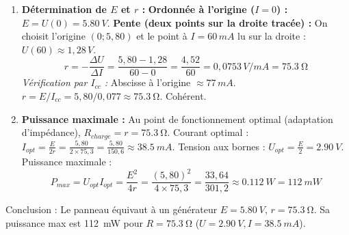 \documentclass[11pt]{article}
\newcommand{\cle}[1]{{\popxbold\color{popdark}#1}}
\begin{document}
\begin{exoresolu}
\begin{enumerate}
\begin{popfigure}
    \end{popfigure}
    Les points expérimentaux sont parfaitement alignés. Le panneau se comporte comme un \textbf{générateur linéaire} (modèle de Thévenin valide).
    \item \textbf{Détermination de $E$ et $r$ :}
    \textbf{Ordonnée à l'origine ($I=0$) :} $E = U(0) = \SI{5,80}{V}$.
    \textbf{Pente (deux points sur la droite tracée) :} On choisit l'origine $(0; 5,80)$ et le point à $I=60\,\si{mA}$ lu sur la droite : $U(60) \approx 1,28\,\si{V}$.
    \[ r = -\frac{\Delta U}{\Delta I} = \frac{5,80 - 1,28}{60 - 0} = \frac{4,52}{60} = 0,0753\,\si{V/mA} = \SI{75,3}{\ohm} \]
    \textit{Vérification par $I_{cc}$ :} Abscisse à l'origine $\approx 77\,\si{mA}$. $r = E/I_{cc} = 5,80 / 0,077 \approx \SI{75,3}{\ohm}$. Cohérent.
    \item \textbf{Puissance maximale :}
    Au point de fonctionnement optimal (adaptation d'impédance), $R_{charge} = r = \SI{75,3}{\ohm}$.
    Courant optimal : $I_{opt} = \frac{E}{2r} = \frac{5,80}{2 \times 75,3} = \frac{5,80}{150,6} \approx \SI{38,5}{mA}$.
    Tension aux bornes : $U_{opt} = \frac{E}{2} = \SI{2,90}{V}$.
    Puissance maximale :
    \[ P_{max} = U_{opt} I_{opt} = \frac{E^2}{4r} = \frac{(5,80)^2}{4 \times 75,3} = \frac{33,64}{301,2} \approx \SI{0,112}{W} = \SI{112}{mW} \]
\end{enumerate}
\cle{Conclusion} : Le panneau équivaut à un générateur $E=\SI{5,80}{V}$, $r=\SI{75,3}{\ohm}$. Sa puissance max est \SI{112}{mW} pour $R=\SI{75,3}{\ohm}$ ($U=\SI{2,90}{V}, I=\SI{38,5}{mA}$).
\end{exoresolu}
\end{document}
